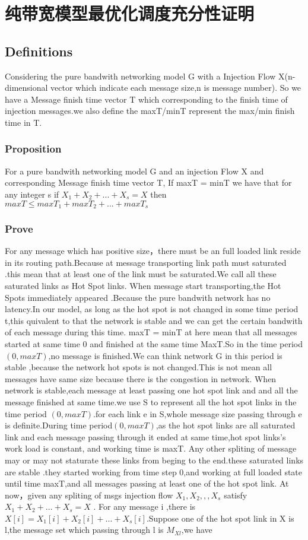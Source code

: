 \documentclass[UTF8,a4paper, 12pt]{ctexart}
\begin{document}
\section {纯带宽模型最优化调度充分性证明}
\subsection {Definitions}
Considering the pure bandwith networking model G with a Injection Flow X(n-dimensional vector which indicate each message size,n is message number). So we have a Message finish time vector T which corresponding to the finish time of injection messages.we also define the maxT/minT represent the max/min finish time in T.
\subsubsection {Proposition}
For a pure bandwith networking model G and an injection Flow X and corresponding Message finish time vector T, If maxT = minT we have that for any integer s if $X_1 + X_2 + ... + X_s = X$ then $maxT \leq maxT_1 + maxT_2 + ... + maxT_s$ 
\subsubsection { Prove}
For any message which has positive size，there must be an full loaded link reside in its routing path.Because at message transporting link path must saturated .this mean that at least one of the link must be saturated.We call all these saturated links as Hot Spot links.  
When message start transporting,the Hot Spots immediately appeared .Because the pure bandwith network has no latency.In our model, as long as the hot spot is not changed in some time period t,this quivalent to that the network  is stable and we can get the certain bandwith of each message during this time.  
maxT = minT at here mean that all messages started at same time 0 and finished at the same time MaxT.So in the time period $(0,maxT)$,no message is finished.We can think network G in this period is stable ,because the network hot spots is not changed.This is not mean all messages have same size because there is the congestion in network.    
When network is stable,each message  at least passing one hot spot link and and all the message finished at same time.we use S to represent all the hot spot links in the time period  $(0,maxT)$.for each link e in S,whole message size passing through e is definite.During time period$(0,maxT)$,as the hot spot links are all saturated link and each message passing through it ended at same time,hot spot links's work load is constant, and working time is maxT.
Any other spliting of message may or may not staturate these links from beging to the end.these saturated links are  stable .they started working from time step 0,and working at full loaded state until time maxT,and all messages passing at least one of the hot spot link.   
At now，given any spliting of msgs injection flow $X_1,X_2,,,X_s$ satisfy $X_1 + X_2 + ... + X_s = X$ . For any message i ,there is $X[i] = X_1[i] + X_2[i]+...+X_s[i]$.Suppose one of the hot spot link in X is l,the message set which passing through l is $M_{Xl}$,we have 
\end{document}
